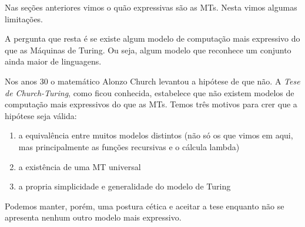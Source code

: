 Nas seções anteriores vimos o quão expressivas são as MTs.
Nesta vimos algumas limitações.

A pergunta que resta é se existe algum modelo de computação mais expressivo do que as Máquinas de Turing.
Ou seja, algum modelo que reconhece um conjunto ainda maior de linguagens.

Nos anos 30 o matemático Alonzo Church levantou a hipótese de que não.
A {\em Tese de Church-Turing}, como ficou conhecida, estabelece que não existem modelos de computação mais expressivos do que as MTs.
Temos três motivos para crer que a hipótese seja válida:
\begin{enumerate}
\item a equivalência entre muitos modelos distintos (não só os que vimos em aqui, mas principalmente as funções recursivas e o cálcula lambda)
\item a existência de uma MT universal
\item a propria simplicidade e generalidade do modelo de Turing
\end{enumerate}

Podemos manter, porém, uma postura cética e aceitar a tese enquanto não se apresenta nenhum outro modelo mais expressivo.